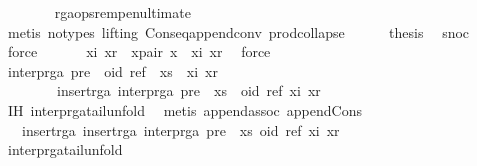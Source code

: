 \begin{isabellebody}
\ \ \ \ \ \ \isamarkupfalse%
\ rga{\isacharunderscore}ops{\isacharunderscore}rem{\isacharunderscore}penultimate\isanewline
\ \ \ \ \ \ \isamarkupfalse%
\ {\isacharparenleft}metis\ {\isacharparenleft}no{\isacharunderscore}types{\isacharcomma}\ lifting{\isacharparenright}\ Cons{\isacharunderscore}eq{\isacharunderscore}append{\isacharunderscore}conv\ prod{\isachardot}collapse{\isacharparenright}\isanewline
\ \ \ \ \isamarkupfalse%
\ {\isacharquery}thesis\ \isamarkupfalse%
\ snoc\ \isamarkupfalse%
\ force\isanewline
\ \ \isamarkupfalse%
\isanewline
\ \ \isamarkupfalse%
\ xi\ xr\ \ x{\isacharunderscore}pair{\isacharcolon}\ {\isachardoublequoteopen}x\ {\isacharequal}\ {\isacharparenleft}xi{\isacharcomma}\ xr{\isacharparenright}{\isachardoublequoteclose}\ \isamarkupfalse%
\ force\isanewline
\ \ \isamarkupfalse%
\ {\isachardoublequoteopen}interp{\isacharunderscore}rga\ {\isacharparenleft}pre\ {\isacharat}\ {\isacharparenleft}oid{\isacharcomma}\ ref{\isacharparenright}\ {\isacharhash}\ xs\ {\isacharat}\ {\isacharbrackleft}{\isacharparenleft}xi{\isacharcomma}\ xr{\isacharparenright}{\isacharbrackright}{\isacharparenright}\ {\isacharequal}\isanewline
\ \ \ \ \ \ \ \ insert{\isacharunderscore}rga\ {\isacharparenleft}interp{\isacharunderscore}rga\ {\isacharparenleft}pre\ {\isacharat}\ xs\ {\isacharat}\ {\isacharbrackleft}{\isacharparenleft}oid{\isacharcomma}\ ref{\isacharparenright}{\isacharbrackright}{\isacharparenright}{\isacharparenright}\ {\isacharparenleft}xi{\isacharcomma}\ xr{\isacharparenright}{\isachardoublequoteclose}\isanewline
\ \ \ \ \isamarkupfalse%
\ IH\ interp{\isacharunderscore}rga{\isacharunderscore}tail{\isacharunderscore}unfold\ \isamarkupfalse%
\ {\isacharparenleft}metis\ append{\isachardot}assoc\ append{\isacharunderscore}Cons{\isacharparenright}\isanewline
\ \ \isamarkupfalse%
\ \isamarkupfalse%
\ {\isachardoublequoteopen}{\isachardot}{\isachardot}{\isachardot}\ {\isacharequal}\ insert{\isacharunderscore}rga\ {\isacharparenleft}insert{\isacharunderscore}rga\ {\isacharparenleft}interp{\isacharunderscore}rga\ {\isacharparenleft}pre\ {\isacharat}\ xs{\isacharparenright}{\isacharparenright}\ {\isacharparenleft}oid{\isacharcomma}\ ref{\isacharparenright}{\isacharparenright}\ {\isacharparenleft}xi{\isacharcomma}\ xr{\isacharparenright}{\isachardoublequoteclose}\isanewline
\ \ \ \ \isamarkupfalse%
\ interp{\isacharunderscore}rga{\isacharunderscore}tail{\isacharunderscore}unfold\ \isamarkupfalse%

\end{isabellebody}
